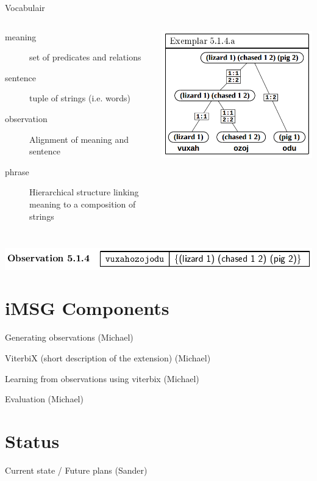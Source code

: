 \documentclass[11pt,a4paper,xcolor=dvipsnames]{beamer}
\begin{document}
\begin{frame}{Vocabulair}
  \begin{columns}[c]
      \begin{description}
        \item[meaning] set of predicates and relations
        \item[sentence] tuple of strings (i.e. words)
        \item[observation] Alignment of meaning and sentence
        \item[phrase] Hierarchical structure linking meaning to a composition of strings
      \end{description}
      \includegraphics[scale=0.2]{assets/examplar514a.png}
  \end{columns}
  \hfill \includegraphics[scale=0.2]{assets/observation514.png}
\end{frame}

\section{iMSG Components}
\begin{frame}
  Generating observations (Michael)
\end{frame}

\begin{frame}
  ViterbiX (short description of the extension) (Michael)
\end{frame}

\begin{frame}
  Learning from observations using viterbix (Michael)
\end{frame}

\begin{frame}
  Evaluation (Michael)
\end{frame}

\section{Status}
\begin{frame}
  Current state / Future plans (Sander)
\end{frame}
\end{document}
